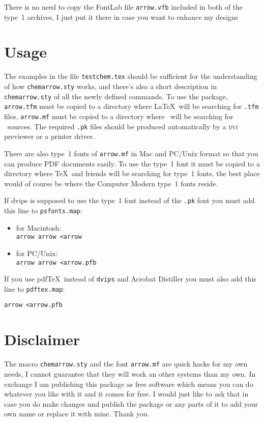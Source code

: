 \documentclass[DIV=9, pagesize=auto]{scrartcl}
\begin{document}
\medskip

There is no need to copy the FontLab file \texttt{arrow.vfb} included in both of the 
type~1 archives, I just put it there in case you want to enhance my designs \smiley


\section{Usage}

The examples in the file \texttt{testchem.tex} should be sufficient for the
understanding of how \texttt{chemarrow.sty} works, and there's also a short 
description in \texttt{chemarrow.sty} of all the newly defined commands. To use the 
package, \texttt{arrow.tfm} must be copied to a directory where \LaTeX\ will be 
searching for \texttt{.tfm} files, \texttt{arrow.mf} must be copied to a directory where 
\MF\ will be searching for \MF\ sources. The required \texttt{.pk} files 
should be produced automatically by a \textsc{dvi} previewer or a printer driver.

There are also type~1 fonts of \texttt{arrow.mf} in Mac and PC/Unix format so that 
you can produce PDF documents easily. To use the type~1 font it must be 
copied to a directory where \TeX\ and friends will be searching for type~1 
fonts, the best place would of course be where the Computer Modern type~1 
fonts reside.

If dvips is supposed to use the type~1 font instead of the \texttt{.pk} font you 
must add this line to \texttt{psfonts.map}:
%
\begin{itemize}
\item for Macintosh:\\
  \verb+arrow arrow <arrow+
  
\item for PC/Unix:\\
  \verb+arrow arrow <arrow.pfb+
\end{itemize}

If you use pdf\TeX\ instead of \texttt{dvips} and Acrobat Distiller you must also add 
this line to \texttt{pdftex.map}:
%
\begin{verbatim}
arrow <arrow.pfb
\end{verbatim}


\section{Disclaimer}

The macro \texttt{chemarrow.sty} and the font \texttt{arrow.mf} are quick hacks for my own 
needs, I cannot guarantee that they will work an other systems than my own. 
In exchange I am publishing this package as free software which means you 
can do whatever you like with it and it comes for free. I would just like 
to ask that in case you do make changes und publish the package or any parts of 
it to add your own name or replace it with mine. Thank you.
\end{document}
